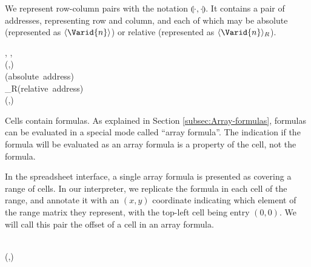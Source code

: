 We represent row-column pairs with the notation \ensuremath{\llparenthesis \cdot , \cdot \rrparenthesis }. It contains a pair
of addresses, representing row and column, and each of which may be absolute
(represented as \ensuremath{\langle \Varid{n}\rangle }) or relative (represented as \ensuremath{\langle \Varid{n}\rangle_{R}}).

\begin{hscode}\SaveRestoreHook
{}%
%
%
%
%
%
%
%
\>[B]{}\;\llparenthesis \cdot , \cdot \rrparenthesis \mathrel{=}\llparenthesis {}, \rrparenthesis {}\<[E]%
\\
\>[B]{}\<[4]%
\>[4]{}\;(,){}\<[E]%
\\[\blanklineskip]%
\>[B]{}\;\<[14]%
\>[14]{}\mathrel{=}{}\<[14E]%
\>[17]{}\langle {}\<[24]%
\>[24]{}\rangle {}\<[29]%
\>[29]{}\mbox{\onelinecomment  (absolute address)}{}\<[E]%
\\
\>[14]{}\mid {}\<[14E]%
\>[17]{}\langle {}\<[24]%
\>[24]{}\rangle_{R}{}\<[29]%
\>[29]{}\mbox{\onelinecomment  (relative address)}{}\<[E]%
\\
\>[B]{}\<[4]%
\>[4]{}\;(,){}\<[E]%
\ColumnHook
\end{hscode}\resethooks

Cells contain formulas. As explained in Section \ref{subsec:Array-formulas},
formulas can be evaluated in a special mode called ``array formula''. The
indication if the formula will be evaluated as an array formula is a property
of the cell, not the formula.

In the spreadsheet interface, a single array formula is presented as covering
a range of cells. In our interpreter, we replicate the formula in each cell of
the range, and annotate it with an $(x, y)$ coordinate indicating which
element of the range matrix they represent, with the top-left cell being entry
$(0, 0)$. We will call this pair the offset of a cell in an array formula.

\begin{hscode}\SaveRestoreHook
{}%
%
%
%
%
%
%
\>[B]{}\;\<[14]%
\>[14]{}\mathrel{=}{}\<[14E]%
\>[17]{}\;{}\<[27]%
\>[27]{}\<[E]%
\\
\>[14]{}\mid {}\<[14E]%
\>[17]{}\;{}\<[27]%
\>[27]{}\;(,){}\<[E]%
\\
\>[B]{}\<[4]%
\>[4]{}\;\<[E]%
\ColumnHook
\end{hscode}\resethooks

